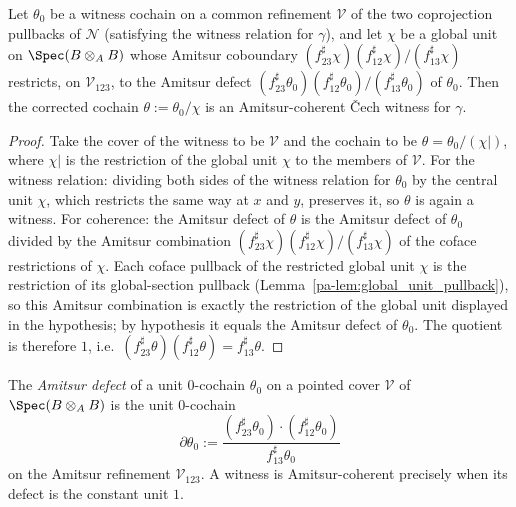 \begin{lemma}
  \label{pa-lem:nonempty_of_defect_eq_coboundary}
  \leanok

  Let \(\theta_0\) be a witness cochain on a common refinement \(\mathcal V\) of the two
  coprojection pullbacks of \(\mathcal N\) (satisfying the witness relation for \(\gamma\)), and
  let \(\chi\) be a global unit on \(\Spec(B \otimes_A B)\) whose Amitsur coboundary
  \((f_{23}^{\sharp}\chi)(f_{12}^{\sharp}\chi)/(f_{13}^{\sharp}\chi)\) restricts, on
  \(\mathcal V_{123}\), to the Amitsur defect
  \((f_{23}^{\sharp}\theta_0)(f_{12}^{\sharp}\theta_0)/(f_{13}^{\sharp}\theta_0)\) of
  \(\theta_0\). Then the corrected cochain \(\theta := \theta_0/\chi\) is an Amitsur-coherent
  \v Cech witness for \(\gamma\).
\end{lemma}
\begin{proof}
  \leanok
  Take the cover of the witness to be \(\mathcal V\) and the cochain to be
  \(\theta = \theta_0/(\chi|)\), where \(\chi|\) is the restriction of the global unit \(\chi\)
  to the members of \(\mathcal V\). For the witness relation: dividing both sides of the
  witness relation for \(\theta_0\) by the central unit \(\chi\), which restricts the same way
  at \(x\) and \(y\), preserves it, so \(\theta\) is again a witness. For coherence: the Amitsur
  defect of \(\theta\) is the Amitsur defect of \(\theta_0\) divided by the Amitsur combination
  \((f_{23}^{\sharp}\chi)(f_{12}^{\sharp}\chi)/(f_{13}^{\sharp}\chi)\) of the coface restrictions
  of \(\chi\). Each coface pullback of the restricted global unit \(\chi\) is the restriction of
  its global-section pullback (Lemma~\ref{pa-lem:global_unit_pullback}), so this Amitsur
  combination is exactly the restriction of the global unit displayed in the hypothesis; by
  hypothesis it equals the Amitsur defect of \(\theta_0\). The quotient is therefore \(1\),
  i.e.\ \((f_{23}^{\sharp}\theta)(f_{12}^{\sharp}\theta) = f_{13}^{\sharp}\theta\).
\end{proof}

\begin{definition}
  \label{pa-def:defectCochain}
  \leanok

  The \emph{Amitsur defect} of a unit \(0\)-cochain \(\theta_0\) on a pointed cover
  \(\mathcal V\) of \(\Spec(B \otimes_A B)\) is the unit \(0\)-cochain
  \[
    \partial\theta_0 :=
      \frac{(f_{23}^{\sharp}\theta_0) \cdot (f_{12}^{\sharp}\theta_0)}{f_{13}^{\sharp}\theta_0}
  \]
  on the Amitsur refinement \(\mathcal V_{123}\). A witness is Amitsur-coherent precisely when
  its defect is the constant unit \(1\).
\end{definition}


